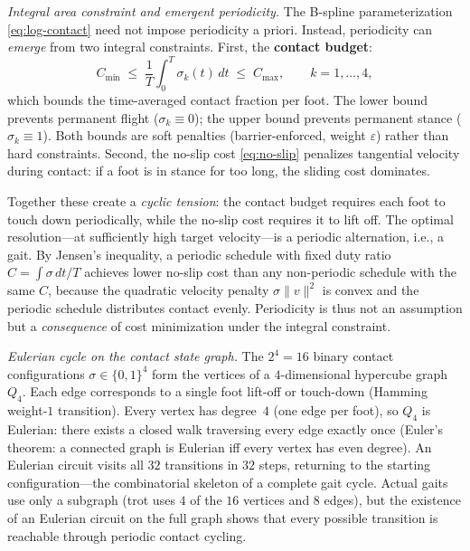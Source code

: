 \medskip\noindent\emph{Integral area constraint and emergent periodicity.}
The B-spline parameterization \eqref{eq:log-contact} need not impose
periodicity a priori.
Instead, periodicity can \emph{emerge} from two integral constraints.
First, the \textbf{contact budget}:
\begin{equation}\label{eq:contact-budget}
  C_{\min} \;\leq\;
  \frac{1}{T}\int_0^T \sigma_k(t)\, dt
  \;\leq\; C_{\max},
  \qquad k = 1, \ldots, 4,
\end{equation}
which bounds the time-averaged contact fraction per foot.
The lower bound prevents permanent flight ($\sigma_k \equiv 0$);
the upper bound prevents permanent stance ($\sigma_k \equiv 1$).
Both bounds are soft penalties (barrier-enforced, weight
$\varepsilon$) rather than hard constraints.
Second, the no-slip cost \eqref{eq:no-slip} penalizes tangential
velocity during contact: if a foot is in stance for too long, the
sliding cost dominates.

Together these create a \emph{cyclic tension}: the contact budget
requires each foot to touch down periodically, while the no-slip cost
requires it to lift off.
The optimal resolution---at sufficiently high target velocity---is a
periodic alternation, i.e., a gait.
By Jensen's inequality, a periodic schedule with fixed duty
ratio $C = \int \sigma\, dt / T$ achieves lower no-slip cost than
any non-periodic schedule with the same $C$, because
the quadratic velocity penalty $\sigma \|v\|^2$ is convex and the
periodic schedule distributes contact evenly.
Periodicity is thus not an assumption but a \emph{consequence} of
cost minimization under the integral constraint.

\medskip\noindent\emph{Eulerian cycle on the contact state graph.}
The $2^4 = 16$ binary contact configurations
$\sigma \in \{0,1\}^4$ form the vertices of a $4$-dimensional
hypercube graph $Q_4$.
Each edge corresponds to a single foot lift-off or touch-down
(Hamming weight-$1$ transition).
Every vertex has degree~$4$ (one edge per foot), so $Q_4$ is
Eulerian: there exists a closed walk traversing every edge exactly
once (Euler's theorem: a connected graph is Eulerian iff every
vertex has even degree).
An Eulerian circuit visits all $32$ transitions in $32$ steps,
returning to the starting configuration---the combinatorial skeleton
of a complete gait cycle.
Actual gaits use only a subgraph (trot uses $4$ of the $16$ vertices
and $8$ edges), but the existence of an Eulerian circuit on the
full graph shows that every possible transition is reachable through
periodic contact cycling.

